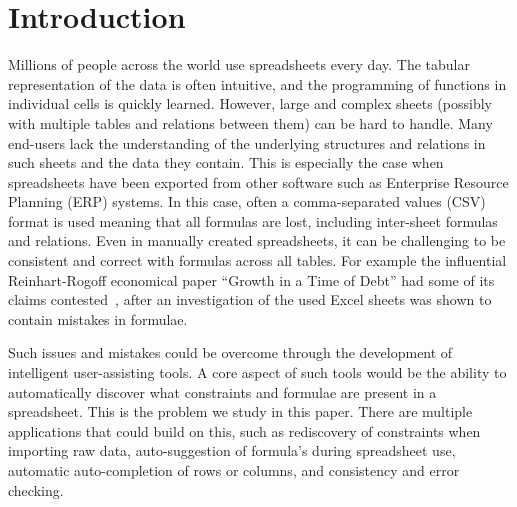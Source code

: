 \section{Introduction}
Millions of people across the world use spreadsheets every day.
The tabular representation of the data is often intuitive, and the programming of functions in individual cells is quickly learned.
However, large and complex sheets (possibly with multiple tables and relations between them) can be hard to handle.
Many end-users lack the understanding of the underlying structures and relations in such sheets and the data they contain.
This is especially the case when spreadsheets have been exported from other software such as Enterprise Resource Planning (ERP) systems.
In this case, often a comma-separated values (CSV) format is used meaning that all formulas are lost, including inter-sheet formulas and relations.
Even in manually created spreadsheets, it can be challenging to be consistent and correct with formulas across all tables.
For example the influential Reinhart-Rogoff economical paper ``Growth in a Time of Debt'' \cite{growth_in_time_of_debt} had some of its claims contested~\cite{flaw_excel}, after an investigation of the used Excel sheets was shown to contain mistakes in formulae.

Such issues and mistakes could be overcome through the development of intelligent user-assisting tools. A core aspect of such tools would be the ability to automatically discover what constraints and formulae are present in a spreadsheet. This is the problem we study in this paper. There are multiple applications that could build on this, such as rediscovery of constraints when importing raw data, auto-suggestion of formula's during spreadsheet use, automatic auto-completion of rows or columns, and consistency and error checking.

